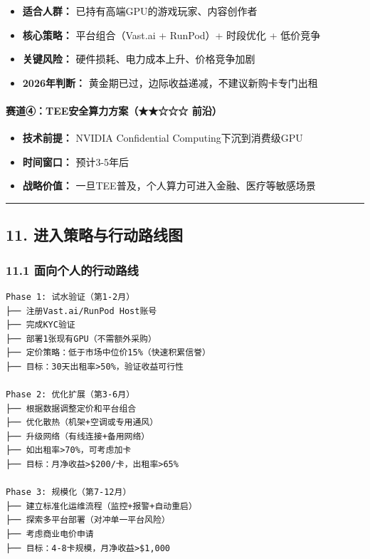 \documentclass[UTF8,a4paper,12pt]{ctexart}
\begin{document}
\begin{itemize}
\tightlist
\item
  \textbf{适合人群：} 已持有高端GPU的游戏玩家、内容创作者
\item
  \textbf{核心策略：} 平台组合（Vast.ai + RunPod）+ 时段优化 + 低价竞争
\item
  \textbf{关键风险：} 硬件损耗、电力成本上升、价格竞争加剧
\item
  \textbf{2026年判断：} 黄金期已过，边际收益递减，不建议新购卡专门出租
\end{itemize}

\paragraph{赛道④：TEE安全算力方案（★★☆☆☆
前沿）}\label{ux8d5bux9053ux2463teeux5b89ux5168ux7b97ux529bux65b9ux6848-ux524dux6cbf}

\begin{itemize}
\tightlist
\item
  \textbf{技术前提：} NVIDIA Confidential Computing下沉到消费级GPU
\item
  \textbf{时间窗口：} 预计3-5年后
\item
  \textbf{战略价值：} 一旦TEE普及，个人算力可进入金融、医疗等敏感场景
\end{itemize}

\begin{center}\rule{0.5\linewidth}{0.5pt}\end{center}

\pagebreak

\subsection{11.
进入策略与行动路线图}\label{ux8fdbux5165ux7b56ux7565ux4e0eux884cux52a8ux8defux7ebfux56fe}

\subsubsection{11.1
面向个人的行动路线}\label{ux9762ux5411ux4e2aux4ebaux7684ux884cux52a8ux8defux7ebf}

\begin{verbatim}
Phase 1: 试水验证（第1-2月）
├── 注册Vast.ai/RunPod Host账号
├── 完成KYC验证
├── 部署1张现有GPU（不需额外采购）
├── 定价策略：低于市场中位价15%（快速积累信誉）
├── 目标：30天出租率>50%，验证收益可行性

Phase 2: 优化扩展（第3-6月）
├── 根据数据调整定价和平台组合
├── 优化散热（机架+空调或专用通风）
├── 升级网络（有线连接+备用网络）
├── 如出租率>70%，可考虑加卡
├── 目标：月净收益>$200/卡，出租率>65%

Phase 3: 规模化（第7-12月）
├── 建立标准化运维流程（监控+报警+自动重启）
├── 探索多平台部署（对冲单一平台风险）
├── 考虑商业电价申请
├── 目标：4-8卡规模，月净收益>$1,000
\end{verbatim}
\end{document}
